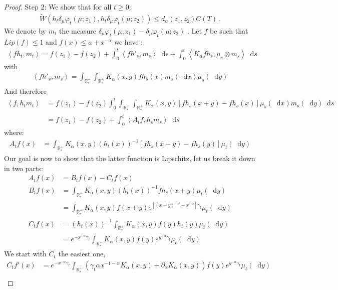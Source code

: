\documentclass[11pt,a4paper]{article}
\newcommand{\RRP}{\mathbb{R}^+_*}
\newcommand{\brac}[1]{\left\langle#1\right\rangle}
\newcommand{\dd}{\mathop{}\!\mathrm{d}}
\begin{document}
\begin{proof}
    Step $2$: We show that for all $t \geq 0$:
    \begin{align*}
        \tilde{W}\left(h_t\delta_\mu\varphi_t(\mu;z_1) ,h_t \delta_\mu\varphi_t(\mu;z_2)\right) \leq d_\alpha(z_1,z_2) C(T)\ .
    \end{align*}
    We denote by $m_t$ the measure $\delta_\mu\varphi_t(\mu;z_1) - \delta_\mu\varphi_t(\mu;z_2)$ . Let $f$ be such that $Lip(f) \leq 1$ and $f(x) \leq a + x^{-\alpha}$ we have :
    \begin{align*}
        \brac{fh_t,m_t} = f(z_1) - f(z_2) + \int_0^t \brac{f h'_s, m_s}  \dd s + \int_0^t \brac{K_\alpha fh_s,\mu_s \otimes m_s} \dd s
    \end{align*}
    with
    \begin{align*}
        \brac{f h'_s ,m_s } = \int_{\RRP}\int_{\RRP} K_\alpha(x,y)fh_s(x) m_s(\dd x)\mu_s(\dd y)
    \end{align*}
    And therefore 
    \begin{align}
        \brac{f,h_tm_t} &= f(z_1) - f(z_2) \int_0^t \int_{\RRP}\int_{\RRP} K_\alpha(x,y)\left[fh_s(x+y) - fh_s(x)\right]\mu_s(\dd x)m_s(\dd y) \dd s \nonumber \\
        &= f(z_1) - f(z_2) + \int_0^t \brac{A_tf, h_sm_s} \dd s \label{eq:proof:wass-derivaitve}
    \end{align}
    where:
    \begin{align*}
        A_tf(x) 
        &= \int_{\RRP}  K_\alpha(x,y) \left(h_t(x)\right)^{-1}\left[fh_s(x+y) - fh_s(y)\right]\mu_t(\dd y)
    \end{align*}
    Our goal is now to show that the latter function is Lipschitz, let us break it down in two parts:
    \begin{align*}
        A_tf(x) &= B_tf(x) - C_tf(x) \\
        B_tf(x) &= \int_{\RRP}  K_\alpha(x,y) \left(h_t(x)\right)^{-1}fh_s(x+y)\mu_t(\dd y)\\
                &= \int_{\RRP}  K_\alpha(x,y)f(x+y) e^{\left[(x+y)^{-\alpha}-x^{-\alpha}\right]\gamma_t }\mu_t(\dd y)\\
        C_tf(x) &= \left(h_t(x)\right)^{-1}\int_{\RRP}  K_\alpha(x,y)f(y)h_t(y) \mu_t(\dd y)\\
                &= e^{-x^{-\alpha}\gamma_t}\int_{\RRP}  K_\alpha(x,y)f(y)e^{y^{-\alpha}\gamma_t} \mu_t(\dd y)
    \end{align*}
    We start with $C_t$ the easiest one,
    \begin{align*}
        C_tf'(x) 
        &=  e^{-x^{-\alpha}\gamma_t}\int_{\RRP} \left(\gamma_t \alpha x^{-1-\alpha} K_\alpha(x,y) + \partial_x K_\alpha(x,y) \right)f(y)e^{y^{-\alpha}\gamma_t} \mu_t(\dd y)  \\

\end{align*}
\end{proof}
\end{document}
